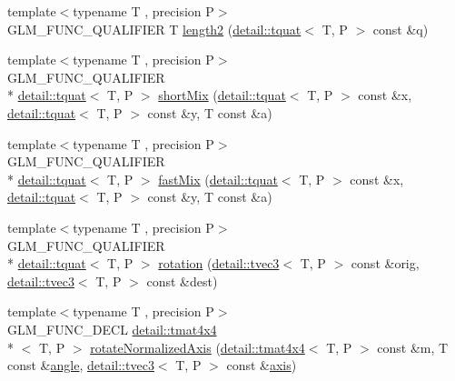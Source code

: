 \begin{DoxyCompactItemize}
\item 
{\footnotesize template$<$typename T , precision P$>$ }\\G\-L\-M\-\_\-\-F\-U\-N\-C\-\_\-\-Q\-U\-A\-L\-I\-F\-I\-E\-R T \hyperlink{group__gtx__quaternion_gaac8d704c7dfac92835109953b88f1c92}{length2} (\hyperlink{structglm_1_1detail_1_1tquat}{detail\-::tquat}$<$ T, P $>$ const \&q)
\item 
{\footnotesize template$<$typename T , precision P$>$ }\\G\-L\-M\-\_\-\-F\-U\-N\-C\-\_\-\-Q\-U\-A\-L\-I\-F\-I\-E\-R \\*
\hyperlink{structglm_1_1detail_1_1tquat}{detail\-::tquat}$<$ T, P $>$ \hyperlink{group__gtx__quaternion_ga297f92682708e59bda1849ca3aad0fea}{short\-Mix} (\hyperlink{structglm_1_1detail_1_1tquat}{detail\-::tquat}$<$ T, P $>$ const \&x, \hyperlink{structglm_1_1detail_1_1tquat}{detail\-::tquat}$<$ T, P $>$ const \&y, T const \&a)
\item 
{\footnotesize template$<$typename T , precision P$>$ }\\G\-L\-M\-\_\-\-F\-U\-N\-C\-\_\-\-Q\-U\-A\-L\-I\-F\-I\-E\-R \\*
\hyperlink{structglm_1_1detail_1_1tquat}{detail\-::tquat}$<$ T, P $>$ \hyperlink{group__gtx__quaternion_ga5d1bb2670d0c73fff5912134ba7c024c}{fast\-Mix} (\hyperlink{structglm_1_1detail_1_1tquat}{detail\-::tquat}$<$ T, P $>$ const \&x, \hyperlink{structglm_1_1detail_1_1tquat}{detail\-::tquat}$<$ T, P $>$ const \&y, T const \&a)
\item 
{\footnotesize template$<$typename T , precision P$>$ }\\G\-L\-M\-\_\-\-F\-U\-N\-C\-\_\-\-Q\-U\-A\-L\-I\-F\-I\-E\-R \\*
\hyperlink{structglm_1_1detail_1_1tquat}{detail\-::tquat}$<$ T, P $>$ \hyperlink{group__gtx__quaternion_ga964b26fdcd9f6f694c1003b0571092a6}{rotation} (\hyperlink{structglm_1_1detail_1_1tvec3}{detail\-::tvec3}$<$ T, P $>$ const \&orig, \hyperlink{structglm_1_1detail_1_1tvec3}{detail\-::tvec3}$<$ T, P $>$ const \&dest)
\item 
{\footnotesize template$<$typename T , precision P$>$ }\\G\-L\-M\-\_\-\-F\-U\-N\-C\-\_\-\-D\-E\-C\-L \hyperlink{structglm_1_1detail_1_1tmat4x4}{detail\-::tmat4x4}\\*
$<$ T, P $>$ \hyperlink{group__gtx__rotate__normalized__axis_gac47b4efcecdaf7e892b10ae89135c544}{rotate\-Normalized\-Axis} (\hyperlink{structglm_1_1detail_1_1tmat4x4}{detail\-::tmat4x4}$<$ T, P $>$ const \&m, T const \&\hyperlink{group__gtc__quaternion_ga23a3fc7ada5bbb665ff84c92c6e0542c}{angle}, \hyperlink{structglm_1_1detail_1_1tvec3}{detail\-::tvec3}$<$ T, P $>$ const \&\hyperlink{group__gtc__quaternion_ga8eef9f8c3f2e4836dccf09df975b20fb}{axis})

\end{DoxyCompactItemize}
